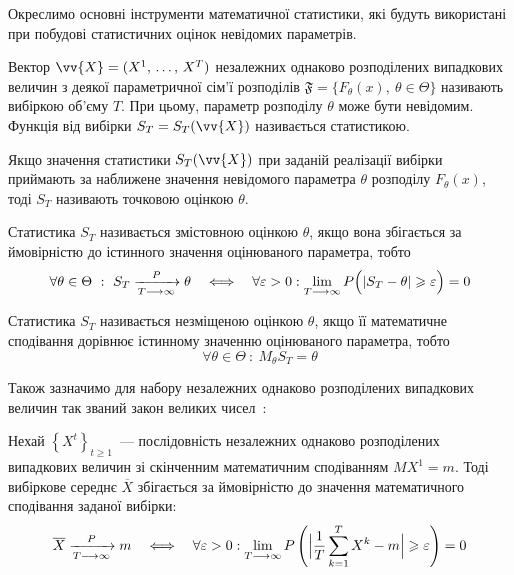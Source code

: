 Окреслимо основні інструменти математичної статистики, які будуть використані при побудові статистичних оцінок невідомих параметрів.

Вектор $\vv{X}=(X^1,\,\ldots,\,X^T)$ незалежних однаково розподілених випадкових величин з деякої параметричної сім'ї розподілів $\mathfrak{F}=\{ F_\theta(x),\ \theta \in \Theta \}$ називають вибіркою об'єму $T$. При цьому, параметр розподілу $\theta$ може бути невідомим. Функція від вибірки $S_T=S_T(\vv{X})$ називається статистикою. 

Якщо значення статистики $S_T(\vv{X})$ при заданій реалізації вибірки приймають за наближене значення невідомого параметра $\theta$ розподілу $F_\theta(x)$, тоді $S_T$ називають точковою оцінкою $\theta$. 

\begin{definition}
    Статистика $S_T$ називається змістовною оцінкою $\theta$, якщо вона збігається за ймовірністю до істинного значення оцінюваного параметра, тобто 
    \begin{equation*}
        \forall \theta \in \Theta\ :\ S_T \xrightarrow[T \longrightarrow \infty]{P} \theta \quad \Longleftrightarrow \quad \forall \varepsilon > 0 : \lim\limits_{T \longrightarrow \infty} P\Bigl( \left|S_T - \theta\right| \geqslant \varepsilon \Bigr) = 0
    \end{equation*}
\end{definition}

\begin{definition}
    Статистика $S_T$ називається незміщеною оцінкою $\theta$, якщо її математичне сподівання дорівнює істинному значенню оцінюваного параметра, тобто
    \begin{equation*}
        \forall \theta \in \Theta\ :\ M_\theta S_T = \theta
    \end{equation*}
\end{definition}

Також зазначимо для набору незалежних однаково розподілених випадкових величин так званий закон великих чисел~\cite{Larsen2017}:

\begin{theorem}\label{theorem: law of big numbers}
    Нехай $\left\{ X^t \right\}_{t\geqslant 1}$~--- послідовність незалежних однаково розподілених випадкових величин зі скінченним математичним сподіванням $MX^1=m$. Тоді вибіркове середнє $\overline{X}$ збігається за ймовірністю до значення математичного сподівання заданої вибірки:
    \begin{equation*}
        \overline{X} \xrightarrow[T \longrightarrow \infty]{P} m \quad \Longleftrightarrow \quad \forall \varepsilon > 0 : \lim\limits_{T \longrightarrow \infty} P\left( \Bigl| \frac{1}{T}\sum\limits_{k=1}^{T} X^k - m \Bigr| \geqslant \varepsilon \right) = 0
    \end{equation*}
\end{theorem}

